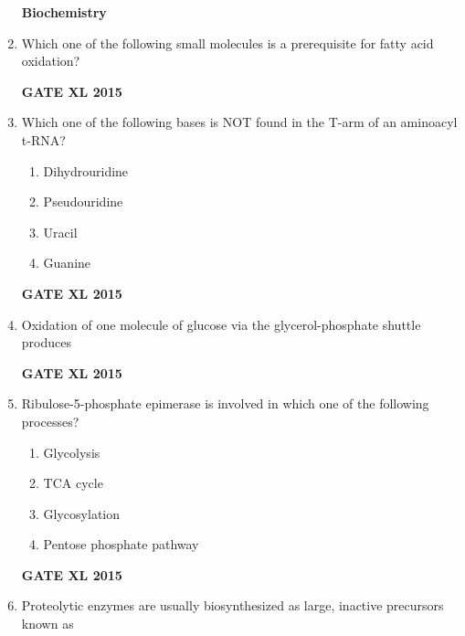 \documentclass[journal,12pt,onecolumn]{IEEEtran}
\begin{document}
\begin{enumerate}
	\textbf{Biochemistry}
\item Which one of the following small molecules is a prerequisite for fatty acid oxidation?
    \begin{enumerate}
    \end{enumerate}
\hfill{\textbf{GATE XL 2015}}
\item Which one of the following bases is NOT found in the T-arm of an aminoacyl t-RNA?
    \begin{enumerate}
            \item Dihydrouridine
	    \item Pseudouridine
	    \item Uracil
            \item Guanine
    \end{enumerate}
\hfill{\textbf{GATE XL 2015}}
\item Oxidation of one molecule of glucose via the glycerol-phosphate shuttle produces
    \begin{enumerate}
    \end{enumerate}
\hfill{\textbf{GATE XL 2015}}
\item Ribulose-5-phosphate epimerase is involved in which one of the following processes?
    \begin{enumerate}
            \item Glycolysis
	    \item TCA cycle
	    \item Glycosylation
            \item Pentose phosphate pathway
    \end{enumerate}
\hfill{\textbf{GATE XL 2015}}
\item Proteolytic enzymes are usually biosynthesized as large, inactive precursors known as

\end{enumerate}
\end{document}
